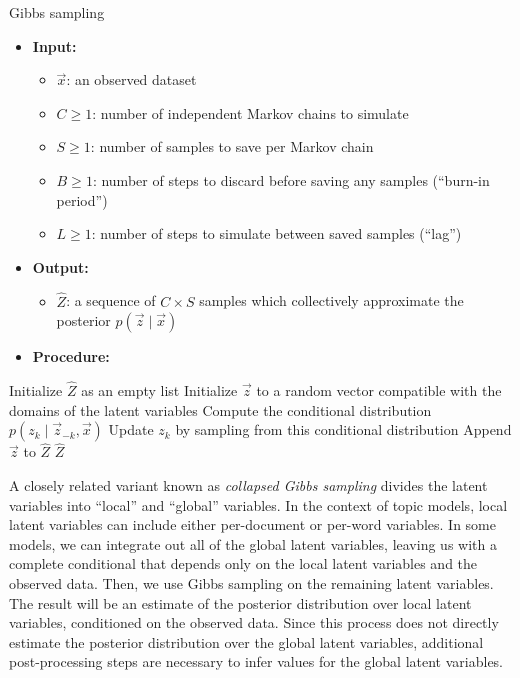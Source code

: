 \documentclass{article}
\begin{document}
\begin{algorithm}
\caption{Gibbs sampling}
\label{alg:gibbs}
\renewcommand{\labelitemi}{{$\bullet$}}
\renewcommand{\labelitemii}{{\tiny$\blacksquare$}}
\begin{itemize}[leftmargin=*]
\item \textbf{Input:}
  \begin{itemize}
  \item $\vec x$: an observed dataset
  \item $C \geq 1$: number of independent Markov chains to simulate
  \item $S \geq 1$: number of samples to save per Markov chain
  \item $B \geq 1$: number of steps to discard before saving any samples (``burn-in period'')
  \item $L \geq 1$: number of steps to simulate between saved samples (``lag'')
  \end{itemize}
\item \textbf{Output:}
  \begin{itemize}
  \item $\hat Z$: a sequence of $C \times S$ samples which collectively approximate the posterior $p(\vec z \mid \vec x)$
  \end{itemize}
\item \textbf{Procedure:}
\end{itemize}
\begin{algorithmic}
\State Initialize $\hat Z$ as an empty list
  \State Initialize $\vec z$ to a random vector compatible with the domains of the latent variables
    \State Compute the conditional distribution $p(z_k \mid \vec z_{-k}, \vec x)$
    \State Update $z_k$ by sampling from this conditional distribution
      \State Append $\vec z$ to $\hat Z$
    \EndIf
  \EndFor
\EndFor
\State \Return $\hat Z$
\end{algorithmic}
\end{algorithm}

A closely related variant known as \emph{collapsed Gibbs sampling} divides the latent variables into ``local'' and ``global'' variables.
In the context of topic models, local latent variables can include either per-document or per-word variables.
In some models, we can integrate out all of the global latent variables, leaving us with a complete conditional that depends only on the local latent variables and the observed data.
Then, we use Gibbs sampling on the remaining latent variables.
The result will be an estimate of the posterior distribution over local latent variables, conditioned on the observed data.
Since this process does not directly estimate the posterior distribution over the global latent variables, additional post-processing steps are necessary to infer values for the global latent variables.
\end{document}
